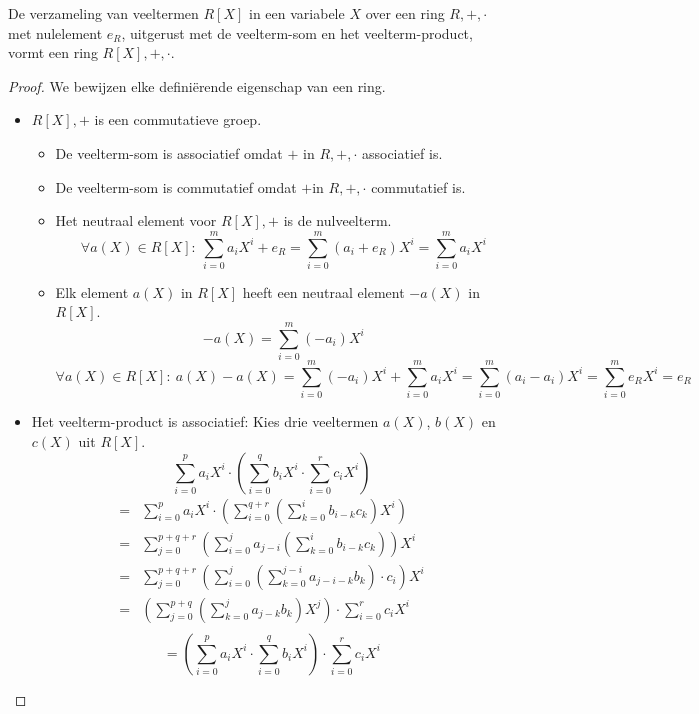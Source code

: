 \documentclass[main.tex]{subfiles}
\begin{document}
\begin{ei}
  De verzameling van veeltermen $R[X]$ in een variabele $X$ over een ring $R,+,\cdot$ met nulelement $e_{R}$, uitgerust met de veelterm-som en het veelterm-product, vormt een ring $R[X],+,\cdot$.

  \begin{proof}
    We bewijzen elke defini\"erende eigenschap van een ring.
    \begin{itemize}
    \item $R[X],+$ is een commutatieve groep.
      \begin{itemize}
      \item De veelterm-som is associatief omdat $+$ in $R,+,\cdot$ associatief is.
      \item De veelterm-som is commutatief omdat $+$in $R,+,\cdot$ commutatief is.
      \item Het neutraal element voor $R[X],+$ is de nulveelterm.
        \[ \forall a(X) \in R[X]:\ \sum_{i=0}^{m}a_{i}X^{i} + e_{R} = \sum_{i=0}^{m}(a_{i}+e_{R})X^{i} = \sum_{i=0}^{m}a_{i}X^{i} \]
      \item Elk element $a(X)$ in $R[X]$ heeft een neutraal element $-a(X)$ in $R[X]$.
        \[ -a(X)  = \sum_{i=0}^{m}(-a_{i}) X^{i} \]
        \[ \forall a(X) \in R[X]:\ a(X) - a(X) = \sum_{i=0}^{m}(-a_{i}) X^{i} + \sum_{i=0}^{m}a_{i} X^{i} = \sum_{i=0}^{m}(a_{i}-a_{i}) X^{i}= \sum_{i=0}^{m}e_{R} X^{i} = e_{R}\]
      \end{itemize}
    \item Het veelterm-product is associatief:
      Kies drie veeltermen $a(X)$, $b(X)$ en $c(X)$ uit $R[X]$.
      \[ \sum_{i=0}^{p}a_{i} X^{i} \cdot \left(\sum_{i=0}^{q}b_{i} X^{i}  \cdot \sum_{i=0}^{r}c_{i} X^{i}\right) \]
      \[
      \begin{array}{rc}
        =&
           \sum_{i=0}^{p}a_{i} X^{i} \cdot \left(\sum_{i=0}^{q+r}\left(\sum_{k=0}^{i}b_{i-k}c_{k}\right)X^{i}\right) \\
        =&
           \sum_{j=0}^{p+q+r}\left(\sum_{i=0}^{j}a_{j-i}\left(\sum_{k=0}^{i}b_{i-k}c_{k}\right)\right)X^{i}\\
        =&
           \sum_{j=0}^{p+q+r}\left(\sum_{i=0}^{j}\left(\sum_{k=0}^{j-i}a_{j-i-k}b_{k}\right)\cdot c_{i}\right)X^{i}\\
        =&
           \left(\sum_{j=0}^{p+q}\left(\sum_{k=0}^{j}a_{j-k}b_{k}\right)X^{j}\right) \cdot \sum_{i=0}^{r}c_{i} X^{i} \\
      \end{array}
      \]
      \[ = \left( \sum_{i=0}^{p}a_{i} X^{i} \cdot \sum_{i=0}^{q}b_{i} X^{i} \right) \cdot \sum_{i=0}^{r}c_{i} X^{i} \]

\end{itemize}
\end{proof}
\end{ei}
\end{document}
